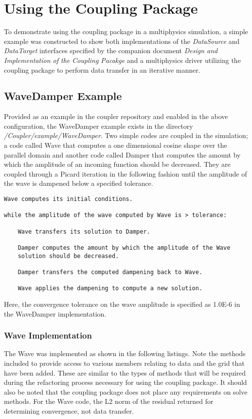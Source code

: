 \documentclass[letterpaper]{article}
\begin{document}
\section{Using the Coupling Package}
To demonstrate using the coupling package in a multiphysics
simulation, a simple example was constructed to show both
implementations of the {\sl DataSource} and {\sl DataTarget}
interfaces specified by the companion document {\sl Design and
  Implementation of the Coupling Pacakge} and a multiphysics driver
utilizing the coupling package to perform data transfer in an
iterative manner.

\subsection{WaveDamper Example}
Provided as an example in the coupler repository and enabled in the
above configuration, the WaveDamper example exists in the directory
{\sl /Coupler/example/WaveDamper}. Two simple codes are coupled in the
simulation; a code called Wave that computes a one dimensional cosine
shape over the parallel domain and another code called Damper that
computes the amount by which the amplitude of an incoming function
should be decreased. They are coupled through a Picard iteration in
the following fashion until the amplitude of the wave is dampened
below a specified tolerance.

\begin{verbatim}
Wave computes its initial conditions.

while the amplitude of the wave computed by Wave is > tolerance:

    Wave transfers its solution to Damper.

    Damper computes the amount by which the amplitude of the Wave
    solution should be decreased.

    Damper transfers the computed dampening back to Wave.

    Wave applies the dampening to compute a new solution.
\end{verbatim}

Here, the convergence tolerance on the wave amplitude is specified as
1.0E-6 in the WaveDamper implementation.

\subsubsection{Wave Implementation}
The Wave was implemented as shown in the following listings. Note the
methods included to provide access to various members relating to data
and the grid that have been added. These are similar to the types of
methods that will be required during the refactoring process necessary
for using the coupling package. It should also be noted that the
coupling package does not place any requirements on solve methods. For
the Wave code, the L2 norm of the residual returned for determining
convergence, not data transfer.
\end{document}
